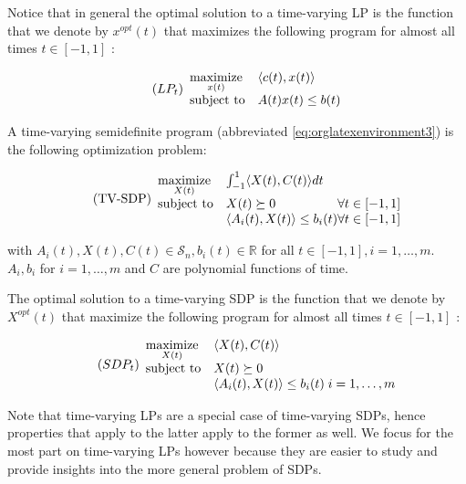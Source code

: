 \documentclass[moor]{informs1}
\begin{document}
Notice that in general the optimal solution to a time-varying LP is the function that we denote by \(x^{opt}(t)\) that maximizes the following program for almost all times \(t \in [-1, 1]\) :

\begin{equation*}
\label{eq:orglatexenvironment2}
\tag{$LP_t$}
\begin{array}{ll@{}ll}
\underset{x(t)}{\text{maximize}} & \langle c(t), x(t) \rangle & \\
\text{subject to}& A(t)x(t) \le b(t)\\
\end{array}
\end{equation*}


A time-varying semidefinite program (abbreviated \ref{eq:orglatexenvironment3}) is the following optimization problem:

\begin{equation*}
\label{eq:orglatexenvironment3}
\tag{TV-SDP}
\begin{array}{ll@{}ll}
\underset{X(t)}{\text{maximize}} & \int_{-1}^1 \langle X(t), C(t) \rangle dt & \\
\text{subject to}& X(t) \succeq 0 & \forall t \in [-1, 1]\\
& \langle A_i(t), X(t) \rangle \le b_i(t) & \forall t \in [-1, 1]
\end{array}
\end{equation*}

\noindent with \(A_i(t) , X(t), C(t) \in \mathcal S_n, b_i(t) \in \mathbb R\) for all \(t \in [-1, 1], i=1, \ldots, m\). \(A_i, b_i\) for \(i=1,\ldots,m\) and \(C\) are polynomial functions of time. 

The optimal solution to a time-varying SDP is the function that we denote by \(X^{opt}(t)\) that maximize the following program for almost all times \(t \in [-1, 1]\) :

\begin{equation*}
\label{eq:orglatexenvironment4}
\tag{$SDP_t$}
\begin{array}{ll@{}ll}
\underset{X(t)}{\text{maximize}} & \langle X(t), C(t) \rangle & \\
\text{subject to}& X(t) \succeq 0\\
& \langle A_i(t), X(t) \rangle \le b_i(t) \; i=1, \ldots, m
\end{array}
\end{equation*}


Note that time-varying LPs are a special case of time-varying SDPs, hence properties that apply to the latter apply to the former as well. We focus for the most part on time-varying LPs however because they are easier to study and provide insights into the more general problem of SDPs.
\end{document}
